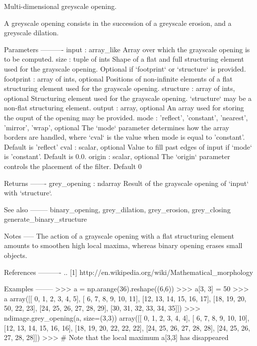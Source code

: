 \begin{DoxyVerb}Multi-dimensional greyscale opening.

A greyscale opening consists in the succession of a greyscale erosion,
and a greyscale dilation.

Parameters
----------
input : array_like
    Array over which the grayscale opening is to be computed.
size : tuple of ints
    Shape of a flat and full structuring element used for the grayscale
    opening. Optional if `footprint` or `structure` is provided.
footprint : array of ints, optional
    Positions of non-infinite elements of a flat structuring element
    used for the grayscale opening.
structure : array of ints, optional
    Structuring element used for the grayscale opening. `structure`
    may be a non-flat structuring element.
output : array, optional
    An array used for storing the ouput of the opening may be provided.
mode : {'reflect', 'constant', 'nearest', 'mirror', 'wrap'}, optional
    The `mode` parameter determines how the array borders are
    handled, where `cval` is the value when mode is equal to
    'constant'. Default is 'reflect'
cval : scalar, optional
    Value to fill past edges of input if `mode` is 'constant'. Default
    is 0.0.
origin : scalar, optional
    The `origin` parameter controls the placement of the filter.
    Default 0

Returns
-------
grey_opening : ndarray
    Result of the grayscale opening of `input` with `structure`.

See also
--------
binary_opening, grey_dilation, grey_erosion, grey_closing
generate_binary_structure

Notes
-----
The action of a grayscale opening with a flat structuring element amounts
to smoothen high local maxima, whereas binary opening erases small objects.

References
----------
.. [1] http://en.wikipedia.org/wiki/Mathematical_morphology

Examples
--------
>>> a = np.arange(36).reshape((6,6))
>>> a[3, 3] = 50
>>> a
array([[ 0,  1,  2,  3,  4,  5],
       [ 6,  7,  8,  9, 10, 11],
       [12, 13, 14, 15, 16, 17],
       [18, 19, 20, 50, 22, 23],
       [24, 25, 26, 27, 28, 29],
       [30, 31, 32, 33, 34, 35]])
>>> ndimage.grey_opening(a, size=(3,3))
array([[ 0,  1,  2,  3,  4,  4],
       [ 6,  7,  8,  9, 10, 10],
       [12, 13, 14, 15, 16, 16],
       [18, 19, 20, 22, 22, 22],
       [24, 25, 26, 27, 28, 28],
       [24, 25, 26, 27, 28, 28]])
>>> # Note that the local maximum a[3,3] has disappeared\end{DoxyVerb}
 \hypertarget{namespacescipy_1_1ndimage_1_1morphology_a243de7395c0bb4289df930f188c83dac}{}
